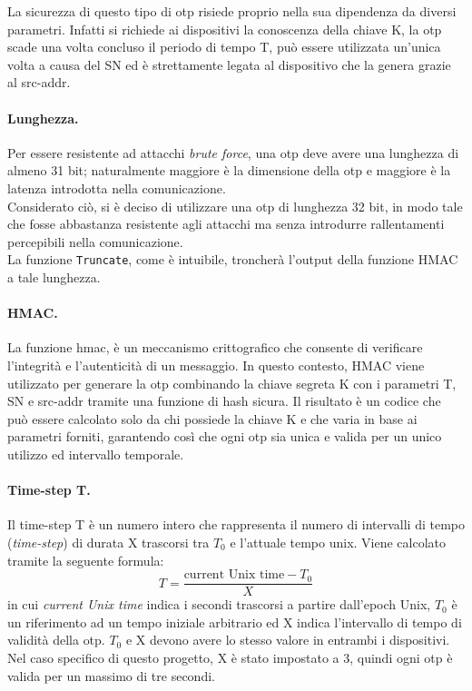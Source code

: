 La sicurezza di questo tipo di \gls{otp} risiede proprio nella sua dipendenza da diversi parametri. Infatti si richiede ai dispositivi la conoscenza della chiave K, la \gls{otp} scade una volta concluso il periodo di tempo T, può essere utilizzata un'unica volta a causa del SN ed è strettamente legata al dispositivo che la genera grazie al src-addr.

\paragraph{Lunghezza.}
Per essere resistente ad attacchi \textit{brute force}, una \gls{otp} deve avere una lunghezza di almeno 31 bit; naturalmente maggiore è la dimensione della \gls{otp} e maggiore è la latenza introdotta nella comunicazione.\\
Considerato ciò, si è deciso di utilizzare una \gls{otp} di lunghezza 32 bit, in modo tale che fosse abbastanza resistente agli attacchi ma senza introdurre rallentamenti percepibili nella comunicazione.\\
La funzione \texttt{Truncate}, come è intuibile, troncherà l'output della funzione HMAC a tale lunghezza.

\paragraph{HMAC.}
La funzione \gls{hmac}\glsfirstoccur, è un meccanismo crittografico che consente di verificare l'integrità e l'autenticità di un messaggio. In questo contesto, HMAC viene utilizzato per generare la \gls{otp} combinando la chiave segreta K con i parametri T, SN e src-addr tramite una funzione di hash sicura. Il risultato è un codice che può essere calcolato solo da chi possiede la chiave K e che varia in base ai parametri forniti, garantendo così che ogni \gls{otp} sia unica e valida per un unico utilizzo ed intervallo temporale.

\paragraph{Time-step T.}
Il time-step T è un numero intero che rappresenta il numero di intervalli di tempo (\textit{time-step}) di durata X trascorsi tra $T_0$ e l'attuale tempo unix. Viene calcolato tramite la seguente formula:
\begin{equation}
    T = \frac{\text{current Unix time} - T_0}{X}
    \label{eq:timestep}
\end{equation}
in cui \textit{current Unix time} indica i secondi trascorsi a partire dall'epoch Unix, $T_0$ è un riferimento ad un tempo iniziale arbitrario ed X indica l'intervallo di tempo di validità della \gls{otp}. $T_0$ e X devono avere lo stesso valore in entrambi i dispositivi.\\
Nel caso specifico di questo progetto, X è stato impostato a 3, quindi ogni \gls{otp} è valida per un massimo di tre secondi.

